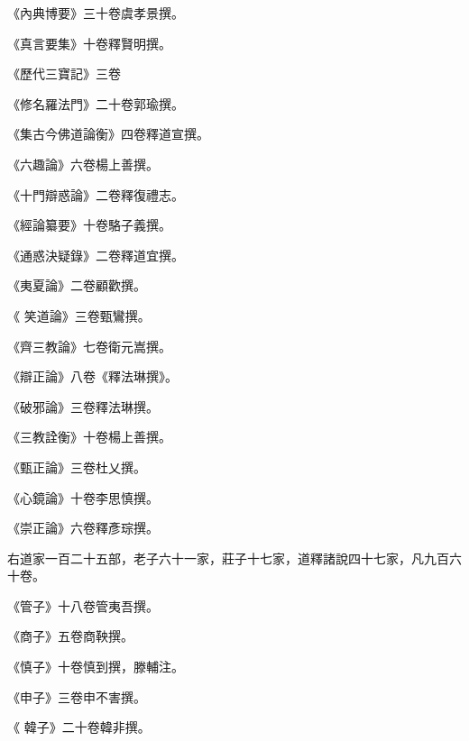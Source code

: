 \begin{pinyinscope}
 《內典博要》三十卷虞孝景撰。



 《真言要集》十卷釋賢明撰。



 《歷代三寶記》三卷



 《修名羅法門》二十卷郭瑜撰。



 《集古今佛道論衡》四卷釋道宣撰。



 《六趣論》六卷楊上善撰。



 《十門辯惑論》二卷釋復禮志。



 《經論纂要》十卷駱子義撰。



 《通惑決疑錄》二卷釋道宜撰。



 《夷夏論》二卷顧歡撰。



 《
 笑道論》三卷甄鸞撰。



 《齊三教論》七卷衛元嵩撰。



 《辯正論》八卷《釋法琳撰》。



 《破邪論》三卷釋法琳撰。



 《三教詮衡》十卷楊上善撰。



 《甄正論》三卷杜乂撰。



 《心鏡論》十卷李思慎撰。



 《崇正論》六卷釋彥琮撰。



 右道家一百二十五部，老子六十一家，莊子十七家，道釋諸說四十七家，凡九百六十卷。



 《管子》十八卷管夷吾撰。



 《商子》五卷商鞅撰。



 《慎子》十卷慎到撰，滕輔注。



 《申子》三卷申不害撰。



 《
 韓子》二十卷韓非撰。




\end{pinyinscope}
